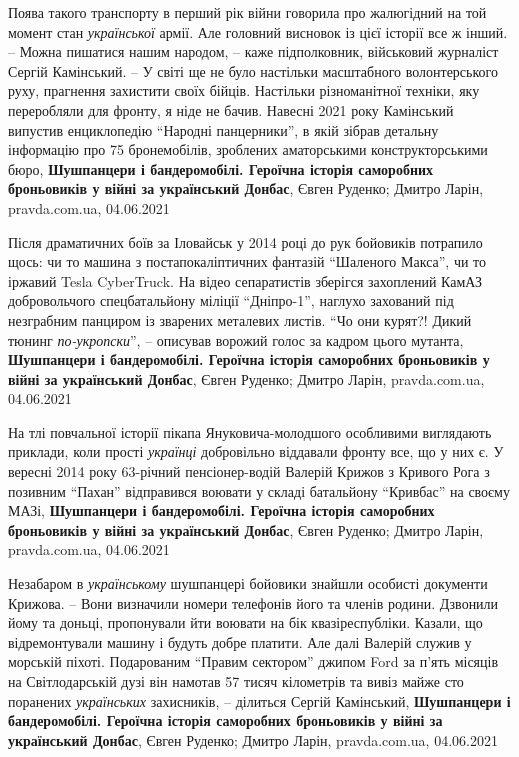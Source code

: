Поява такого транспорту в перший рік війни говорила про жалюгідний на той
момент стан \emph{української} армії. Але головний висновок із цієї історії все
ж інший.  – Можна пишатися нашим народом, – каже підполковник, військовий
журналіст Сергій Камінський. – У світі ще не було настільки масштабного
волонтерського руху, прагнення захистити своїх бійців. Настільки різноманітної
техніки, яку переробляли для фронту, я ніде не бачив.  Навесні 2021 року
Камінський випустив енциклопедію \enquote{Народні панцерники}, в якій зібрав
детальну інформацію про 75 бронемобілів, зроблених аматорськими
конструкторськими бюро,
\textbf{Шушпанцери і бандеромобілі. Героїчна історія саморобних броньовиків у війні за український Донбас},
Євген Руденко; Дмитро Ларін, pravda.com.ua, 04.06.2021

Після драматичних боїв за Іловайськ у 2014 році до рук бойовиків потрапило
щось: чи то машина з постапокаліптичних фантазій \enquote{Шаленого Макса}, чи то
іржавий Tesla CyberTruck.  На відео сепаратистів зберігся захоплений КамАЗ
добровольчого спецбатальйону міліції \enquote{Дніпро-1}, наглухо захований під
незграбним панциром із зварених металевих листів.  \enquote{Чо они курят?! Дикий тюнинг
\emph{по-укропски}}, – описував ворожий голос за кадром цього мутанта,
\textbf{Шушпанцери і бандеромобілі. Героїчна історія саморобних броньовиків у війні за український Донбас},
Євген Руденко; Дмитро Ларін, pravda.com.ua, 04.06.2021

На тлі повчальної історії пікапа Януковича-молодшого особливими виглядають
приклади, коли прості \emph{українці} добровільно віддавали фронту все, що у них є.  У
вересні 2014 року 63-річний пенсіонер-водій Валерій Крижов з Кривого Рога з
позивним \enquote{Пахан} відправився воювати у складі батальйону \enquote{Кривбас} на своєму
МАЗі,
\textbf{Шушпанцери і бандеромобілі. Героїчна історія саморобних броньовиків у війні за український Донбас},
Євген Руденко; Дмитро Ларін, pravda.com.ua, 04.06.2021

Незабаром в \emph{українському} шушпанцері бойовики знайшли особисті документи
Крижова.  – Вони визначили номери телефонів його та членів родини. Дзвонили
йому та доньці, пропонували йти воювати на бік квазіреспубліки. Казали, що
відремонтували машину і будуть добре платити. Але далі Валерій служив у
морській піхоті. Подарованим \enquote{Правим сектором} джипом Ford за п'ять місяців на
Світлодарській дузі він намотав 57 тисяч кілометрів та вивіз майже сто
поранених \emph{українських} захисників, – ділиться Сергій Камінський,
\textbf{Шушпанцери і бандеромобілі. Героїчна історія саморобних броньовиків у війні за український Донбас},
Євген Руденко; Дмитро Ларін, pravda.com.ua, 04.06.2021

